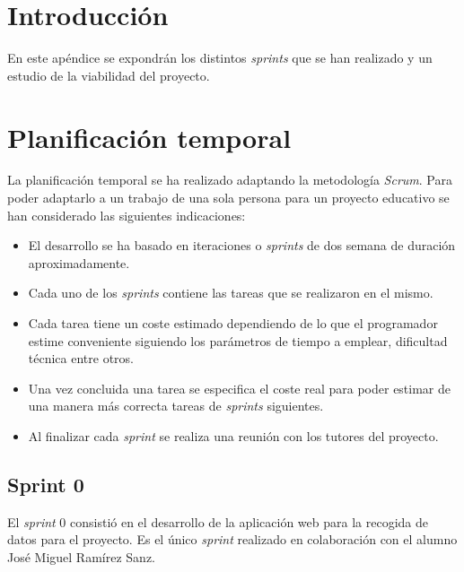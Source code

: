 
\section{Introducción}

En este apéndice se expondrán los distintos \textit{sprints} que se han realizado y un estudio de la viabilidad del proyecto.

\section{Planificación temporal}

La planificación temporal se ha realizado adaptando la metodología \textit{Scrum}. Para poder adaptarlo a un trabajo de una sola persona para un proyecto educativo se han considerado las siguientes indicaciones:

\begin{itemize}
	\item El desarrollo se ha basado en iteraciones o \textit{sprints} de dos semana de duración aproximadamente.
	\item Cada uno de los \textit{sprints} contiene las tareas que se realizaron en el mismo. 
	\item Cada tarea tiene un coste estimado dependiendo de lo que el programador estime conveniente siguiendo los parámetros de tiempo a emplear, dificultad técnica entre otros.
	\item Una vez concluida una tarea se especifica el coste real para poder estimar de una manera más correcta tareas de \textit{sprints} siguientes.
	\item Al finalizar cada \textit{sprint} se realiza una reunión con los tutores del proyecto.
\end{itemize}

\subsection{Sprint 0}

El \textit{sprint} 0 consistió en el desarrollo de la aplicación web para la recogida de datos para el proyecto. Es el único \textit{sprint} realizado en colaboración con el alumno José Miguel Ramírez Sanz. 

